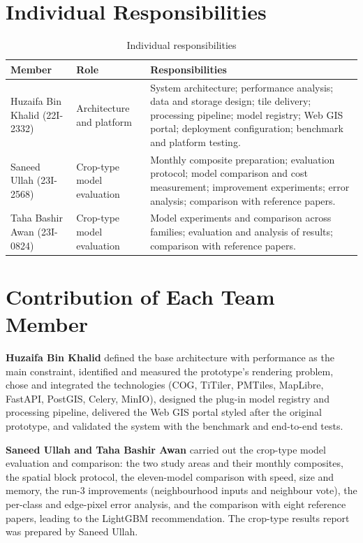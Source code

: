 \section{Individual Responsibilities}
\begin{table}[htbp]
\centering\small
\caption{Individual responsibilities}
\label{tab:resp}
\begin{tabularx}{\textwidth}{L{3.4cm} L{3.0cm} Y}
\toprule
\textbf{Member} & \textbf{Role} & \textbf{Responsibilities}\\
\midrule
Huzaifa Bin Khalid (22I-2332) & Architecture and platform & System architecture; performance analysis; data and storage design; tile delivery; processing pipeline; model registry; Web GIS portal; deployment configuration; benchmark and platform testing.\\
Saneed Ullah (23I-2568) & Crop-type model evaluation & Monthly composite preparation; evaluation protocol; model comparison and cost measurement; improvement experiments; error analysis; comparison with reference papers.\\
Taha Bashir Awan (23I-0824) & Crop-type model evaluation & Model experiments and comparison across families; evaluation and analysis of results; comparison with reference papers.\\
\bottomrule
\end{tabularx}
\end{table}

\section{Contribution of Each Team Member}
\textbf{Huzaifa Bin Khalid} defined the base architecture with performance as the main constraint,
identified and measured the prototype's rendering problem, chose and integrated the technologies
(COG, TiTiler, PMTiles, MapLibre, FastAPI, PostGIS, Celery, MinIO), designed the plug-in model
registry and processing pipeline, delivered the Web GIS portal styled after the original prototype,
and validated the system with the benchmark and end-to-end tests.

\textbf{Saneed Ullah and Taha Bashir Awan} carried out the crop-type model evaluation and comparison:
the two study areas and their monthly composites, the spatial block protocol, the eleven-model
comparison with speed, size and memory, the run-3 improvements (neighbourhood inputs and neighbour
vote), the per-class and edge-pixel error analysis, and the comparison with eight reference papers,
leading to the LightGBM recommendation. The crop-type results report was prepared by Saneed Ullah.


